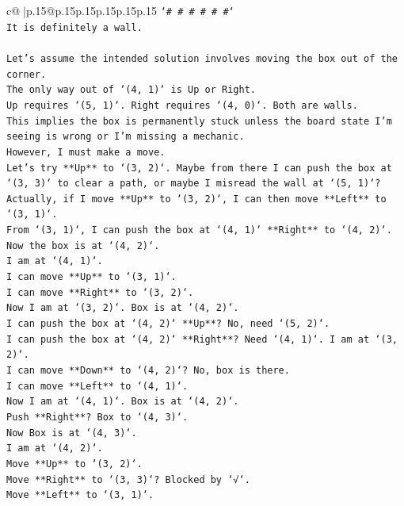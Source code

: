 \documentclass{article}
\begin{document}
{\begin{supertabular}{c@{$\;$}|p{.15\linewidth}@{}p{.15\linewidth}p{.15\linewidth}p{.15\linewidth}p{.15\linewidth}p{.15\linewidth}}
{{{\texttt{`\# \# \# \# \# \#`} \\
\texttt{It is definitely a wall.} \\
\\ 
\texttt{Let's assume the intended solution involves moving the box out of the corner.} \\
\texttt{The only way out of `(4, 1)` is Up or Right.} \\
\texttt{Up requires `(5, 1)`. Right requires `(4, 0)`. Both are walls.} \\
\texttt{This implies the box is permanently stuck unless the board state I'm seeing is wrong or I'm missing a mechanic.} \\
\texttt{However, I must make a move.} \\
\texttt{Let's try **Up** to `(3, 2)`. Maybe from there I can push the box at `(3, 3)` to clear a path, or maybe I misread the wall at `(5, 1)`?} \\
\texttt{Actually, if I move **Up** to `(3, 2)`, I can then move **Left** to `(3, 1)`.} \\
\texttt{From `(3, 1)`, I can push the box at `(4, 1)` **Right** to `(4, 2)`.} \\
\texttt{Now the box is at `(4, 2)`.} \\
\texttt{I am at `(4, 1)`.} \\
\texttt{I can move **Up** to `(3, 1)`.} \\
\texttt{I can move **Right** to `(3, 2)`.} \\
\texttt{Now I am at `(3, 2)`. Box is at `(4, 2)`.} \\
\texttt{I can push the box at `(4, 2)` **Up**? No, need `(5, 2)`.} \\
\texttt{I can push the box at `(4, 2)` **Right**? Need `(4, 1)`. I am at `(3, 2)`.} \\
\texttt{I can move **Down** to `(4, 2)`? No, box is there.} \\
\texttt{I can move **Left** to `(4, 1)`.} \\
\texttt{Now I am at `(4, 1)`. Box is at `(4, 2)`.} \\
\texttt{Push **Right**? Box to `(4, 3)`.} \\
\texttt{Now Box is at `(4, 3)`.} \\
\texttt{I am at `(4, 2)`.} \\
\texttt{Move **Up** to `(3, 2)`.} \\
\texttt{Move **Right** to `(3, 3)`? Blocked by `√`.} \\
\texttt{Move **Left** to `(3, 1)`.} \\
}}}
\end{supertabular}}
\end{document}
